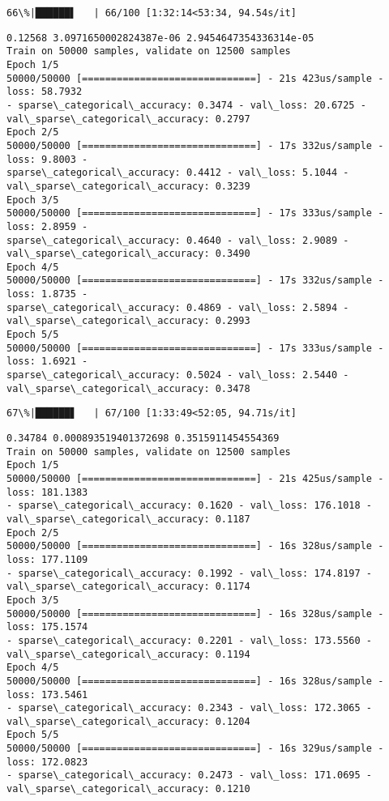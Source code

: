 \documentclass[11pt]{article}
\begin{document}
    \begin{Verbatim}[commandchars=\\\{\}]
 66\%|██████▌   | 66/100 [1:32:14<53:34, 94.54s/it]
    \end{Verbatim}

    \begin{Verbatim}[commandchars=\\\{\}]
0.12568 3.0971650002824387e-06 2.9454647354336314e-05
Train on 50000 samples, validate on 12500 samples
Epoch 1/5
50000/50000 [==============================] - 21s 423us/sample - loss: 58.7932
- sparse\_categorical\_accuracy: 0.3474 - val\_loss: 20.6725 -
val\_sparse\_categorical\_accuracy: 0.2797
Epoch 2/5
50000/50000 [==============================] - 17s 332us/sample - loss: 9.8003 -
sparse\_categorical\_accuracy: 0.4412 - val\_loss: 5.1044 -
val\_sparse\_categorical\_accuracy: 0.3239
Epoch 3/5
50000/50000 [==============================] - 17s 333us/sample - loss: 2.8959 -
sparse\_categorical\_accuracy: 0.4640 - val\_loss: 2.9089 -
val\_sparse\_categorical\_accuracy: 0.3490
Epoch 4/5
50000/50000 [==============================] - 17s 332us/sample - loss: 1.8735 -
sparse\_categorical\_accuracy: 0.4869 - val\_loss: 2.5894 -
val\_sparse\_categorical\_accuracy: 0.2993
Epoch 5/5
50000/50000 [==============================] - 17s 333us/sample - loss: 1.6921 -
sparse\_categorical\_accuracy: 0.5024 - val\_loss: 2.5440 -
val\_sparse\_categorical\_accuracy: 0.3478
    \end{Verbatim}

    \begin{Verbatim}[commandchars=\\\{\}]
 67\%|██████▋   | 67/100 [1:33:49<52:05, 94.71s/it]
    \end{Verbatim}

    \begin{Verbatim}[commandchars=\\\{\}]
0.34784 0.000893519401372698 0.3515911454554369
Train on 50000 samples, validate on 12500 samples
Epoch 1/5
50000/50000 [==============================] - 21s 425us/sample - loss: 181.1383
- sparse\_categorical\_accuracy: 0.1620 - val\_loss: 176.1018 -
val\_sparse\_categorical\_accuracy: 0.1187
Epoch 2/5
50000/50000 [==============================] - 16s 328us/sample - loss: 177.1109
- sparse\_categorical\_accuracy: 0.1992 - val\_loss: 174.8197 -
val\_sparse\_categorical\_accuracy: 0.1174
Epoch 3/5
50000/50000 [==============================] - 16s 328us/sample - loss: 175.1574
- sparse\_categorical\_accuracy: 0.2201 - val\_loss: 173.5560 -
val\_sparse\_categorical\_accuracy: 0.1194
Epoch 4/5
50000/50000 [==============================] - 16s 328us/sample - loss: 173.5461
- sparse\_categorical\_accuracy: 0.2343 - val\_loss: 172.3065 -
val\_sparse\_categorical\_accuracy: 0.1204
Epoch 5/5
50000/50000 [==============================] - 16s 329us/sample - loss: 172.0823
- sparse\_categorical\_accuracy: 0.2473 - val\_loss: 171.0695 -
val\_sparse\_categorical\_accuracy: 0.1210
    \end{Verbatim}
\end{document}
